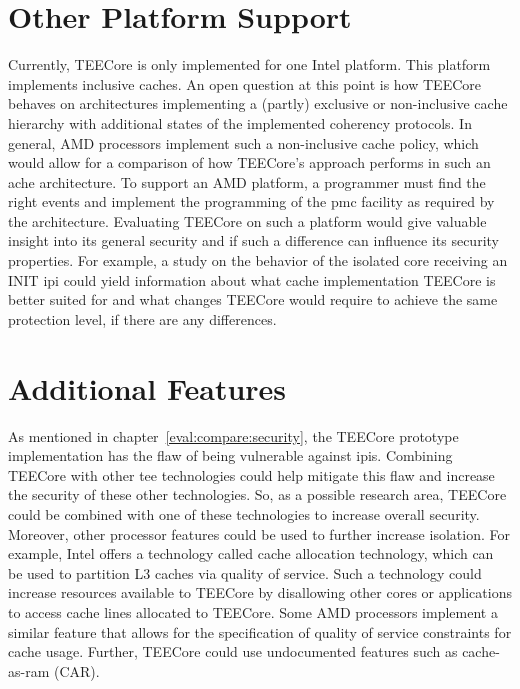 \section{Other Platform Support}
Currently, TEECore is only implemented for one Intel platform. This platform
implements inclusive caches. An open question at this point is how TEECore
behaves on architectures implementing a (partly) exclusive or non-inclusive
cache hierarchy with additional states of the implemented coherency protocols.
In general, AMD processors implement such a non-inclusive cache policy, which
would allow for a comparison of how TEECore's approach performs in such an ache
architecture. To support an AMD platform, a programmer must find the right
events and implement the programming of the \gls{pmc} facility as required by
the architecture. Evaluating TEECore on such a platform would give valuable
insight into its general security and if such a difference can influence its
security properties. For example, a study on the behavior of the isolated core
receiving an INIT \gls{ipi} could yield information about what cache
implementation TEECore is better suited for and what changes TEECore would
require to achieve the same protection level, if there are any differences.

\section{Additional Features}
As mentioned in chapter~\ref{eval:compare:security}, the TEECore prototype
implementation has the flaw of being vulnerable against \glspl{ipi}. Combining
TEECore with other \gls{tee} technologies could help mitigate this flaw and
increase the security of these other technologies. So, as a possible research
area, TEECore could be combined with one of these technologies to increase
overall security. Moreover, other processor features could be used to further
increase isolation. For example, Intel offers a technology called cache
allocation technology, which can be used to partition L3 caches via quality of
service. Such a technology could increase resources available to TEECore by
disallowing other cores or applications to access cache lines allocated to
TEECore. Some AMD processors implement a similar feature that allows for the
specification of quality of service constraints for cache usage. Further,
TEECore could use undocumented features such as cache-as-ram (CAR).

\cleardoublepage
